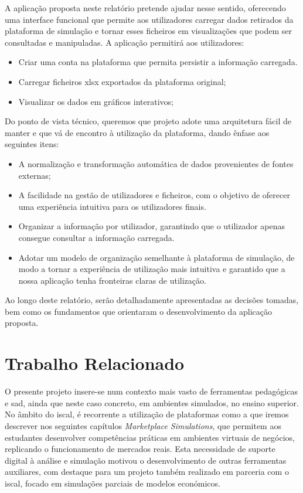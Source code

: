 A aplicação proposta neste relatório pretende ajudar nesse sentido, oferecendo uma interface  funcional que permite aos utilizadores carregar dados retirados da plataforma de simulação e tornar esses ficheiros em visualizações que podem ser consultadas e manipuladas. A aplicação permitirá aos utilizadores:
\begin{itemize}
    \item Criar uma conta na plataforma que permita persistir a informação carregada.
    \item Carregar ficheiros \gls{xlsx} exportados da plataforma original;
    \item Visualizar os dados em gráficos interativos;
\end{itemize}

Do ponto de vista técnico, queremos que  projeto adote uma arquitetura fácil de manter e que vá de encontro à utilização da plataforma, dando ênfase aos seguintes itens:
\begin{itemize}
    \item A normalização e transformação automática de dados provenientes de fontes externas;
    \item A facilidade na gestão de utilizadores e ficheiros, com o objetivo de oferecer uma experiência intuitiva para os utilizadores finais.
    \item Organizar a informação por utilizador, garantindo que o utilizador apenas consegue consultar a informação carregada.
    \item Adotar um modelo de organização semelhante à plataforma de simulação, de modo a tornar a experiência de utilização mais intuitiva e garantido que a nossa aplicação tenha fronteiras claras de utilização.
\end{itemize}

Ao longo deste relatório, serão detalhadamente apresentadas as decisões tomadas, bem como os fundamentos que orientaram o desenvolvimento da aplicação proposta.

\chapter{Trabalho Relacionado}
\label{ch:trabalhoRelacionado}

O presente projeto insere-se num contexto mais vasto de ferramentas pedagógicas e \gls{sad}, ainda que neste caso concreto,  em ambientes simulados, no ensino superior. No âmbito do \gls{iscal}, é recorrente a utilização de plataformas como a que iremos descrever nos seguintes capítulos \textit{Marketplace Simulations}, que permitem aos estudantes desenvolver competências práticas em ambientes virtuais de negócios, replicando o funcionamento de mercados reais. Esta necessidade de suporte digital à análise e simulação motivou o desenvolvimento de outras ferramentas auxiliares, com destaque para um projeto também realizado em parceria com o \gls{iscal}, focado em simulações parciais de modelos económicos.

